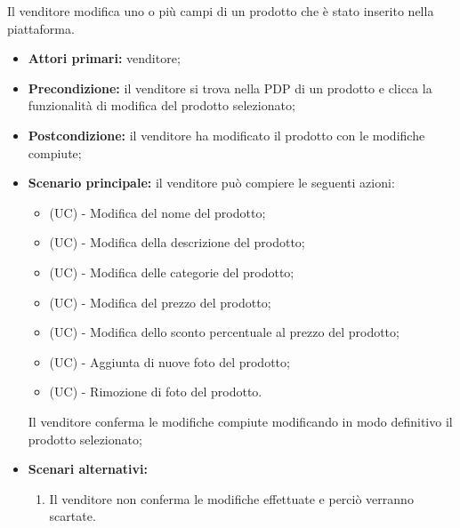

Il venditore modifica uno o più campi di un prodotto che è stato inserito nella piattaforma.
\begin{itemize}
    \item \textbf{Attori primari:} venditore;
    \item \textbf{Precondizione:} il venditore si trova nella PDP di un prodotto e clicca la funzionalità di modifica del prodotto selezionato;
    \item \textbf{Postcondizione:} il venditore ha modificato il prodotto con le modifiche compiute;
    \item \textbf{Scenario principale:} il venditore può compiere le seguenti azioni:
    \begin{itemize}
        \item (UC) - Modifica del nome del prodotto;
        \item (UC) - Modifica della descrizione del prodotto;
        \item (UC) - Modifica delle categorie del prodotto;
        \item (UC) - Modifica del prezzo del prodotto;
        \item (UC) - Modifica dello sconto percentuale al prezzo del prodotto;
        \item (UC) - Aggiunta di nuove foto del prodotto;
        \item (UC) - Rimozione di foto del prodotto.
    \end{itemize}
    Il venditore conferma le modifiche compiute modificando in modo definitivo il prodotto selezionato;
    \item \textbf{Scenari alternativi:}
    \begin{enumerate}[label=\lett]
    	\item Il venditore non conferma le modifiche effettuate e perciò verranno scartate.
    \end{enumerate}
\end{itemize}

